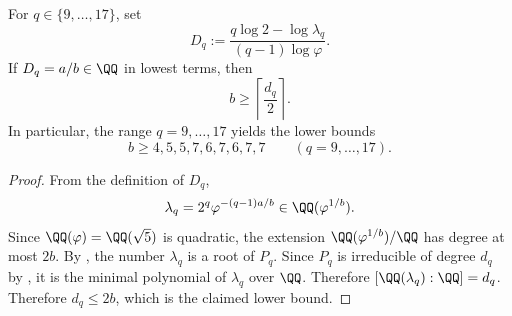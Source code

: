 \begin{corollary}
\label{cor:renyi-rational-denominator}
For \(q\in\{9,\dots,17\}\), set
\[
  D_q:=\frac{q\log 2-\log \lambda_q}{(q-1)\log\varphi}.
\]
If \(D_q=a/b\in\QQ\) in lowest terms, then
\[
  b\ge \left\lceil\frac{d_q}{2}\right\rceil.
\]
In particular, the range \(q=9,\dots,17\) yields the lower bounds
\[
  b\ge 4,5,5,7,6,7,6,7,7
  \qquad (q=9,\dots,17).
\]
\end{corollary}

\begin{proof}
From the definition of \(D_q\),
\[
  \lambda_q = 2^q\varphi^{-(q-1)a/b}\in \QQ(\varphi^{1/b}).
\]
Since \(\QQ(\varphi)=\QQ(\sqrt5)\) is quadratic, the extension
\(\QQ(\varphi^{1/b})/\QQ\) has degree at most \(2b\).  By
, the number \(\lambda_q\) is a root
of \(P_q\).  Since \(P_q\) is irreducible of degree \(d_q\) by
, it is the minimal polynomial of
\(\lambda_q\) over \(\QQ\).  Therefore \([\QQ(\lambda_q):\QQ]=d_q\).
Therefore \(d_q\le 2b\), which is the claimed lower bound.
\end{proof}

